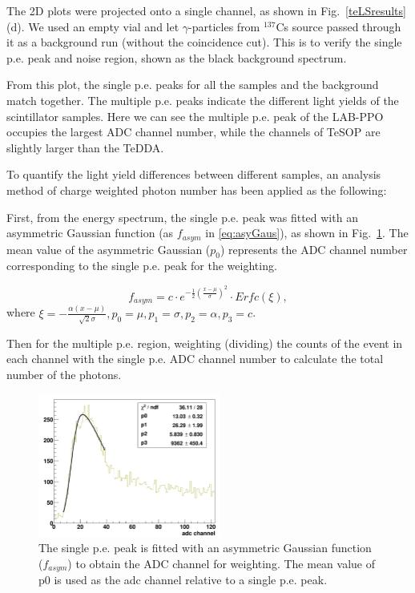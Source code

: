 The 2D plots were projected onto a single channel, as shown in 
Fig.~\ref{teLSresults} (d). We used an empty vial and let $\gamma$-particles from $^{137}$Cs source passed through it as a background run (without the coincidence cut). This is to verify the single p.e. peak and noise region, shown as the black background spectrum.

From this plot, the single p.e. peaks for all the samples and the background match together. The multiple p.e. peaks indicate the different light yields of the scintillator samples. Here we can see the multiple p.e. peak of the LAB-PPO occupies the largest ADC channel number, while the channels of TeSOP are slightly larger than the TeDDA. 

To quantify the light yield differences between different samples, an analysis method of charge weighted photon number has been applied as the following:

First, from the energy spectrum, the single p.e. peak was fitted with an asymmetric Gaussian function (as $f_{asym}$ in \ref{eq:asyGaus}), as shown in Fig.~\ref{fitSinglePE}. The mean value of the asymmetric Gaussian ($p_0$) represents the ADC channel number corresponding to the single p.e. peak for the weighting. 

\begin{equation}\label{eq:asyGaus}
f_{asym}=c\cdot e^{-\frac{1}{2}(\frac{x-\mu}{\sigma})^2}\cdot Erfc(\xi),
\end{equation}
where $\xi=-\frac{\alpha(x-\mu)}{\sqrt 2\sigma},p_0=\mu,p_1=\sigma,p_2=\alpha, p_3=c$.

Then for the multiple p.e. region, weighting (dividing) the counts of the event in each channel with the single p.e. ADC channel number to calculate the total number of the photons.

\begin{figure}[htbp]
	\centering	
	\includegraphics[width=6cm]{fitSinglePE.png}
	\caption[The single p.e. peak fitted with an asymmetric Gaussian function.]{The single p.e. peak is fitted with an asymmetric Gaussian function ($f_{asym}$) to obtain the ADC channel for weighting. The mean value of p0 is used as the adc channel relative to a single p.e. peak.}
	\label{fitSinglePE}
\end{figure}

